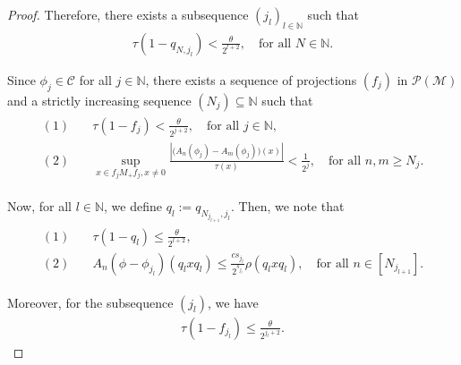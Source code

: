 \documentclass[10pt,a4paper]{amsart}
\begin{document}
\begin{proof}
		
		\noindent Therefore, there exists a subsequence $(j_l)_{l \in \mathbb{N}}$ such that  
		\begin{align*}
			\tau(1 - q_{N, j_l}) < \frac{\theta}{2^{l+2}},  \quad \text{for all } N \in \mathbb{N}.
		\end{align*}
		
		
		Since $\phi_j \in \mathcal{C}$ for all $j \in \mathbb{N}$, there exists a sequence of projections $(f_j)$ in $\mathcal{P}(\mathcal{M})$ and a strictly increasing sequence $(N_j) \subseteq \mathbb{N}$ such that  
		\begin{align*}
			\begin{split}
				(1)\quad &\tau(1 - f_j)  < \frac{\theta}{2^{j+2}},  \quad \text{for all } j \in \mathbb{N}, \\
				(2)\quad &\sup_{x \in f_j M_+ f_j, x \neq 0} \frac{\left| \big(A_n(\phi_j) - A_m(\phi_j) \big)(x) \right|}{\tau(x)} < \frac{1}{2^j},  \quad \text{for all } n, m \geq N_j.
			\end{split}
		\end{align*}
		
		\noindent Now, for all $l \in \mathbb{N}$, we define $q_l := q_{N_{j_{l+1}}, j_l}$. Then, we note that  
		\begin{align*}
			\begin{split}
				(1)\quad &\tau(1 - q_l) \leq \frac{\theta}{2^{l+2}}, \\
				(2)\quad &A_n(\phi - \phi_{j_l}) (q_l x q_l) \leq   \frac{cs_{j_{l}}}{2^{s_{j_l}}} \rho(q_l x q_l),  
				\quad \text{for all }n \in [N_{j_{l +1}}].
			\end{split}
		\end{align*}
		
		
		
		\noindent Moreover, for the subsequence $(j_l)$, we have  
		\begin{align*}
			\tau(1 - f_{j_l}) \leq \frac{\theta}{2^{j_l+2}}.
		\end{align*}
		

\end{proof}
\end{document}
